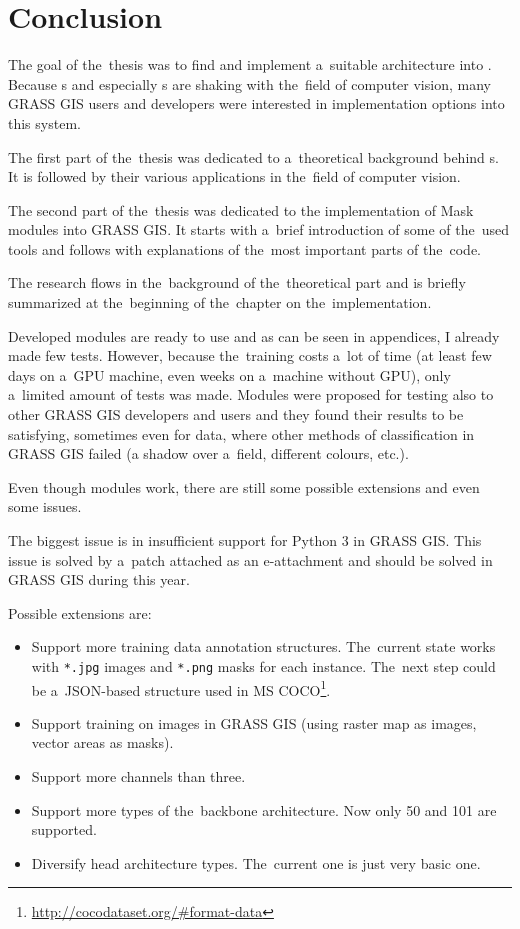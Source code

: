 \chapter{Conclusion}
\label{conclusion}

The goal of the~thesis was to find and implement a~suitable  
architecture into  . Because s and especially 
s are shaking with the~field of computer vision, many GRASS GIS users 
and developers were interested in implementation options into this system.

The first part of the~thesis was dedicated to a~theoretical background behind 
s. It is followed by their various applications in the~field of computer 
vision. 

The second part of the~thesis was dedicated to the implementation of Mask  
modules into GRASS GIS. It starts with a~brief introduction of some of the~used 
tools and follows with explanations of the~most important parts of the~code.

The research flows in the~background of the~theoretical part and is briefly 
summarized at the~beginning of the~chapter on the~implementation.

Developed modules are ready to use and as can be seen in appendices, I already 
made few tests. However, because the~training costs a~lot of time (at least few 
days on a~GPU machine, even weeks on a~machine without GPU), only a~limited 
amount of tests was made. Modules were proposed for testing also to other GRASS 
GIS developers and users and they found their results to be satisfying, 
sometimes even for data, where other methods of classification in GRASS GIS 
failed (a shadow over a~field, different colours, etc.).

Even though modules work, there are still some possible extensions and even some 
issues.

The biggest issue is in insufficient support for Python 3 in GRASS GIS. This 
issue is solved by a~patch attached as an e-attachment and should be solved in 
GRASS GIS during this year.

Possible extensions are:
\begin{itemize}
	\item Support more training data annotation structures. The~current state works with \verb|*.jpg| images and \verb|*.png| masks for each instance. The~next step could be a~JSON-based structure used in MS COCO\footnote{\url{http://cocodataset.org/\#format-data}}.
	\item Support training on images in GRASS GIS (using raster map as images, vector areas as masks).
	\item Support more channels than three.
	\item Support more types of the~backbone architecture. Now only  50 and  101 are supported.
	\item Diversify head architecture types. The~current one is just very basic one.
\end{itemize}

